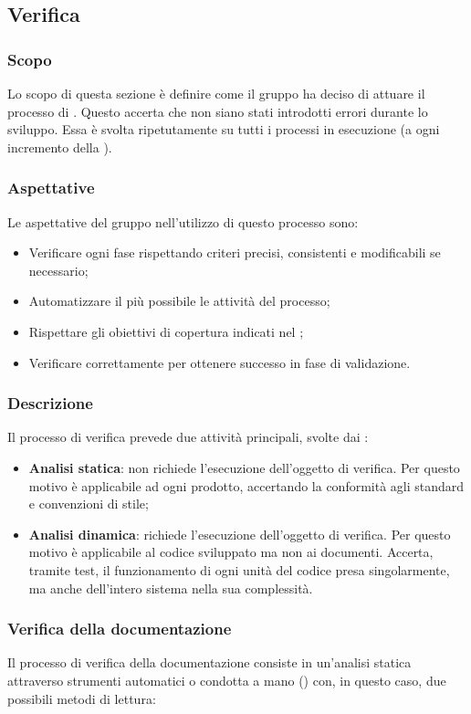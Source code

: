 \subsection{Verifica}
\subsubsection{Scopo}
Lo scopo di questa sezione è definire come il gruppo ha deciso di attuare il processo di . Questo accerta che non siano stati introdotti errori durante lo sviluppo. Essa è svolta ripetutamente su tutti i processi in esecuzione (a ogni incremento della ).

\subsubsection{Aspettative}
Le aspettative del gruppo \Gruppo{} nell'utilizzo di questo processo sono:
\begin{itemize}
	\item Verificare ogni fase rispettando criteri precisi, consistenti e modificabili se necessario;
	\item Automatizzare il più possibile le attività del processo;
	\item Rispettare gli obiettivi di copertura indicati nel \PdQv;
	\item Verificare correttamente per ottenere successo in fase di validazione.
\end{itemize}

\subsubsection{Descrizione}
Il processo di verifica prevede due attività principali, svolte dai :
\begin{itemize}
	\item \textbf{Analisi statica}: non richiede l'esecuzione dell'oggetto di verifica. Per questo motivo è applicabile ad ogni prodotto, accertando la conformità agli standard e convenzioni di stile;
	\item \textbf{Analisi dinamica}: richiede l'esecuzione dell'oggetto di verifica. Per questo motivo è applicabile al codice sviluppato ma non ai documenti. Accerta, tramite test, il funzionamento di ogni unità del codice presa singolarmente, ma anche dell'intero sistema nella sua complessità.
\end{itemize}

\subsubsection{Verifica della documentazione}
Il processo di verifica della documentazione consiste in un'analisi statica attraverso strumenti automatici o condotta a mano () con, in questo caso, due possibili metodi di lettura:   

